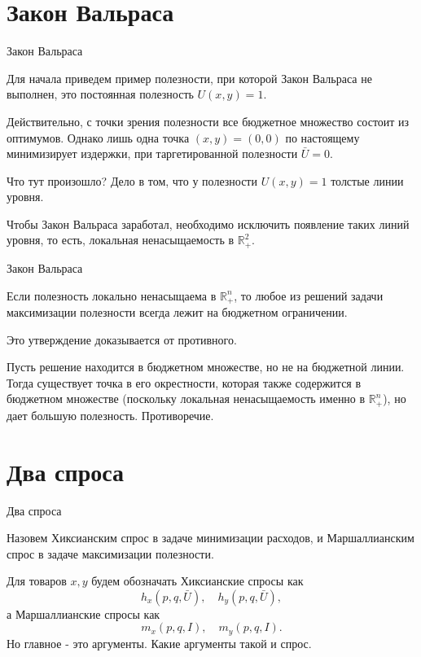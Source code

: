 \documentclass{beamer}
\begin{document}
\section{Закон Вальраса}

\begin{frame}{Закон Вальраса}

Для начала приведем пример полезности, при которой Закон Вальраса не выполнен, это постоянная полезность $U(x,y) = 1$. 

Действительно, с точки зрения полезности все бюджетное множество состоит из оптимумов. Однако лишь одна точка $(x,y)=(0,0)$ по настоящему минимизирует издержки, при таргетированной полезности $\bar U = 0$. 

Что тут произошло? Дело в том, что у полезности $U(x,y) = 1$ толстые линии уровня. 

Чтобы Закон Вальраса заработал, необходимо исключить появление таких линий уровня, то есть, локальная ненасыщаемость в $\mathbb{R}^2_{+}$.

\end{frame}

\begin{frame}{Закон Вальраса}

\begin{theorem}
Если полезность локально ненасыщаема в $\mathbb{R}^n_{+}$, то любое из решений задачи максимизации полезности всегда лежит на бюджетном ограничении.
\end{theorem}

Это утверждение доказывается от противного. 

Пусть решение находится в бюджетном множестве, но не на бюджетной линии. Тогда существует точка в его окрестности, которая также содержится в бюджетном множестве (поскольку локальная ненасыщаемость именно в $\mathbb{R}^n_{+}$), но дает большую полезность. Противоречие.

\end{frame}

\section{Два спроса}

\begin{frame}{Два спроса}

\begin{definition}
Назовем \alert{Хиксианским спрос} в задаче минимизации расходов, и \alert{Маршаллианским спрос} в задаче максимизации полезности. 
\end{definition}

Для товаров $x,y$ будем обозначать Хиксианские спросы как 
$$h_x(p,q,\bar U), \quad h_y(p,q,\bar U),$$
а Маршаллианские спросы как
$$m_x(p,q,I), \quad m_y(p,q,I).$$
Но главное - это аргументы. Какие аргументы такой и спрос.

\end{frame}
\end{document}
